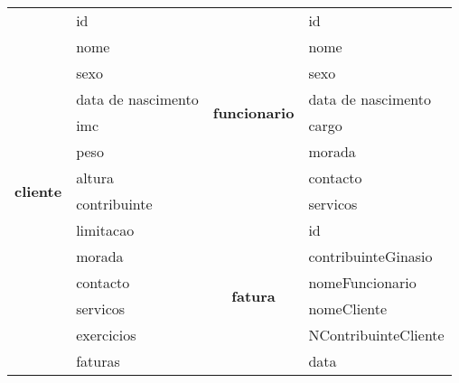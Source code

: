 \begin{table}[h]
\centering
\begin{tabular}{cl|c|l|}
\hline
\multicolumn{1}{|c|}{\multirow{14}{*}{\textbf{cliente}}} & id                 & \multirow{8}{*}{\textbf{funcionario}} & id                   \\
\multicolumn{1}{|c|}{}                                   & nome               &                                       & nome                 \\
\multicolumn{1}{|c|}{}                                   & sexo               &                                       & sexo                 \\
\multicolumn{1}{|c|}{}                                   & data de nascimento &                                       & data de nascimento   \\
\multicolumn{1}{|c|}{}                                   & imc                &                                       & cargo                \\
\multicolumn{1}{|c|}{}                                   & peso               &                                       & morada               \\
\multicolumn{1}{|c|}{}                                   & altura             &                                       & contacto             \\
\multicolumn{1}{|c|}{}                                   & contribuinte       &                                       & servicos             \\ \cline{3-4} 
\multicolumn{1}{|c|}{}                                   & limitacao          & \multirow{11}{*}{\textbf{fatura}}     & id                   \\
\multicolumn{1}{|c|}{}                                   & morada             &                                       & contribuinteGinasio  \\
\multicolumn{1}{|c|}{}                                   & contacto           &                                       & nomeFuncionario      \\
\multicolumn{1}{|c|}{}                                   & servicos           &                                       & nomeCliente          \\
\multicolumn{1}{|c|}{}                                   & exercicios         &                                       & NContribuinteCliente \\
\multicolumn{1}{|c|}{}                                   & faturas            &                                       & data                 \\ \cline{1-2}

\end{tabular}
\end{table}
